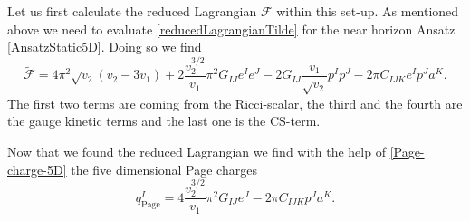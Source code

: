 \documentclass[12pt,twoside]{book}
\begin{document}
\begin{appendices}
Let us first calculate the reduced Lagrangian $\mathcal{F}$ within this set-up. As mentioned above we need to evaluate \eqref{reducedLagrangianTilde} for the near horizon Ansatz \eqref{AnsatzStatic5D}. Doing so we find
\begin{equation}\label{redLagTildeEval}
\tilde{\mathcal{F}} = 4\pi^{2} \sqrt{v_{2}} (v_{2} - 3v_{1}) + 2 \frac{v_{2}^{3/2}}{v_{1}} \pi^{2} G_{IJ} e^{I}e^{J} -
2G_{IJ} \frac{v_{1}}{\sqrt{v_{2}}} p^{I}p^{J} - 2 \pi C_{IJK} e^{I} p^{J} a^{K}.
\end{equation}
The first two terms are coming from the Ricci-scalar, the third and the fourth are the gauge kinetic terms and the last one is the CS-term.

Now that we found the reduced Lagrangian we find with the help of \eqref{Page-charge-5D} the five dimensional Page charges
\begin{equation}\label{Page-5D-staticBH}
q^{I}_{\mathrm{Page}} = 4 \frac{v_{2}^{3/2}}{v_{1}} \pi^{2} G_{IJ} e^{J} - 2\pi C_{IJK} p^{J} a^{K}.
\end{equation}


\end{appendices}
\end{document}
